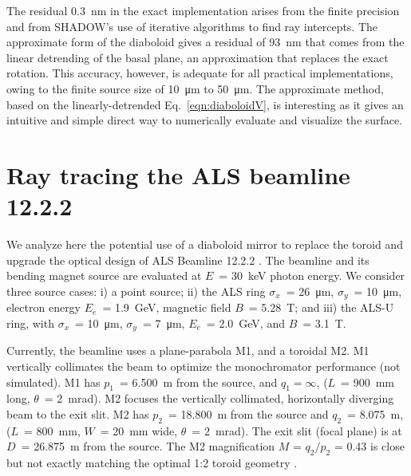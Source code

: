\documentclass{iucr}       %
\begin{document}
The residual \SI{0.3}{\nano\meter} in the exact implementation arises from the finite precision and from SHADOW's use of iterative algorithms to find ray intercepts.
The approximate form of the diaboloid gives a residual of \SI{93}{\nano\meter} that comes from the linear detrending of the basal plane, an approximation that replaces the exact rotation. This accuracy, however, is adequate for all practical implementations, owing to the finite source size of \SI{10}{\micro\meter} to \SI{50}{\micro\meter}. The approximate method, based on the linearly-detrended Eq.~\ref{eqn:diaboloidV}, is interesting as it gives an intuitive and simple direct way to numerically evaluate and visualize the surface.

\section{Ray tracing the ALS beamline 12.2.2}
\label{sec:beamline}

We analyze here the potential use of a diaboloid mirror to replace the toroid and upgrade the optical design of ALS Beamline 12.2.2 \cite{bl1222,MacDowell2004}. The beamline and its bending magnet source are evaluated at $E$~= \SI{30}{\kilo\electronvolt} photon energy. We consider three source cases: i) a point source; ii) the ALS ring
$\sigma_x$~= \SI{26}{\micro\meter}, $\sigma_y$~= \SI{10}{\micro\meter}, 
electron energy $E_e$~= \SI{1.9}{\giga\electronvolt}, magnetic field $B$~= \SI{5.28}{\tesla}; and iii) the ALS-U ring, with $\sigma_x$~= \SI{10}{\micro\meter}, $\sigma_y$~= \SI{7}{\micro\meter}, $E_e$~= \SI{2.0}{\giga\electronvolt}, and $B$~= \SI{3.1}{\tesla}. 

Currently, the beamline uses a plane-parabola M1, and a toroidal M2. M1 vertically collimates the beam to optimize the monochromator performance (not simulated). M1 has $p_1$~= \SI{6.500}{\meter} from the source, and $q_1 = \infty$, ($L$~= \SI{900}{\milli\meter} long, $\theta$~= \SI{2}{\milli\radian}). M2 focuses the vertically collimated, horizontally diverging beam to the exit slit. M2 has $p_2$~= \SI{18.800}{\meter} from the source and $q_2$~= \SI{8.075}{\meter}, ($L$~= \SI{800}{\milli\meter}, $W$~= \SI{20}{\milli\meter} wide, $\theta$~= \SI{2}{\milli\radian}). The exit slit (focal plane) is at $D$~= \SI{26.875}{\meter} from the source. The M2 magnification $M$ = $q_2/p_2$ = 0.43 is close but not exactly matching the optimal 1:2 toroid geometry \cite{MacDowell2004}.
\end{document}
